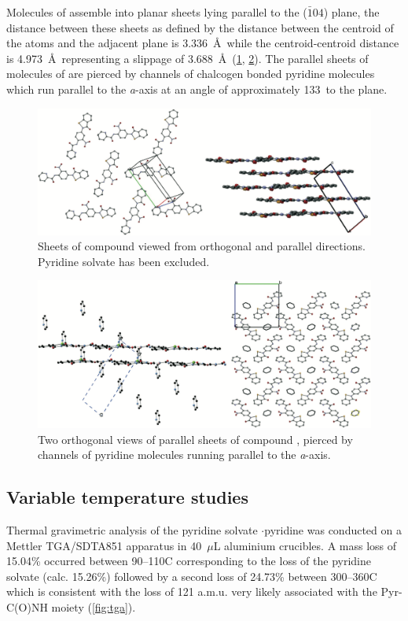 \begin{refsection}
Molecules of  assemble into planar sheets lying parallel to the ($\bar{1} 0 4$) plane, the distance between these sheets as defined by the distance between the centroid of the atoms  and the adjacent plane is 3.336~\AA~while the centroid-centroid distance is 4.973~\AA~representing a slippage of 3.688~\AA~(\cref{fig:ebs-nitroamide-2py-sheets-1}, \cref{fig:ebs-nitroamide-2py-sheets-2}).
The parallel sheets of molecules of  are pierced by channels of chalcogen bonded pyridine molecules which run parallel to the \emph{a}-axis at an angle of approximately 133\degree~to the plane.

\begin{figure}
    \centering
    \includegraphics[width=0.8\linewidth]{Figures/ebs-nitroamide-2py-sheets-1.pdf}
    \caption{Sheets of compound  viewed from orthogonal and parallel directions. Pyridine solvate has been excluded.}
    \label{fig:ebs-nitroamide-2py-sheets-1}
\end{figure}

\begin{figure}
    \centering
    \includegraphics[width=0.8\linewidth]{Figures/ebs-nitroamide-2py-sheets-2.pdf}
    \caption{Two orthogonal views of parallel sheets of compound , pierced by channels of pyridine molecules running parallel to the \emph{a}-axis.}
    \label{fig:ebs-nitroamide-2py-sheets-2}
\end{figure}

\subsection{Variable temperature studies}
Thermal gravimetric analysis of the pyridine solvate $\cdot$pyridine was conducted on a Mettler TGA/SDTA851 apparatus in 40~$\mu$L aluminium crucibles.
A mass loss of 15.04\% occurred between 90--110\degree C corresponding to the loss of the pyridine solvate (calc. 15.26\%) followed by a second loss of 24.73\% between 300--360\degree C which is consistent with the loss of 121 a.m.u. very likely associated with the Pyr-C(O)NH moiety (\cref{fig:tga}).


\end{refsection}
